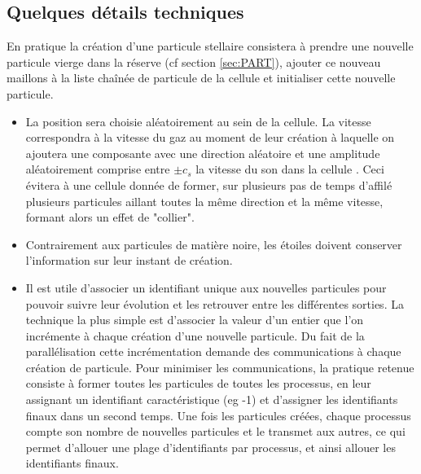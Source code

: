 
\subsection{Quelques détails techniques}
En pratique la création d'une particule stellaire consistera à prendre une nouvelle particule vierge dans la réserve (cf section \ref{sec:PART}), ajouter ce nouveau maillons à la liste chaînée de particule de la cellule et initialiser cette nouvelle particule.

\begin{itemize}

\item La position sera choisie aléatoirement au sein de la cellule.
La vitesse correspondra à la vitesse du gaz au moment de leur création à laquelle on ajoutera une composante avec une direction aléatoire et une amplitude aléatoirement comprise entre $\pm c_s$ la vitesse du son dans la cellule \citep{rasera_history_2006}.
Ceci évitera à une cellule donnée de former, sur plusieurs pas de temps d'affilé plusieurs particules aillant toutes la même direction et la même vitesse, formant alors un effet de "collier".

\item Contrairement aux particules de matière noire, les étoiles doivent conserver l'information sur leur instant de création.


\item Il est utile d'associer un identifiant unique aux nouvelles particules pour pouvoir suivre leur évolution et les retrouver entre les différentes sorties.
La technique la plus simple est d'associer la valeur d'un entier que l'on incrémente à chaque création d'une nouvelle particule.
Du fait de la parallélisation cette incrémentation demande des communications à chaque création de particule.
Pour minimiser les communications, la pratique retenue consiste à former toutes les particules de toutes les processus, en leur assignant un identifiant caractéristique (eg -1) et d'assigner les identifiants finaux dans un second temps.
Une fois les particules créées, chaque processus compte son nombre de nouvelles particules et le transmet aux autres, ce qui permet d'allouer une plage d'identifiants par processus, et ainsi allouer les identifiants finaux.
\end{itemize}

